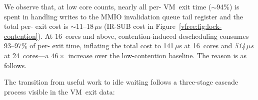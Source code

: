 We observe that, at low core counts, nearly all per- VM~exit time (${\sim}$94\%) is spent in handling writes to the MMIO invalidation queue tail register 
and the total per- exit cost is ${\sim}$11--18\,$\mu$s (IR-SUB cost in Figure~\ref{vfree:fig:lock-contention}).
At 16~cores and above, contention-induced descheduling consumes
 {93--97\%} of per- exit time, inflating the total cost to 141\,$\mu$s at 16~cores and \textit{514\,$\mu$s} at 24~cores---a $46\times$ increase over the low-contention baseline.
 The reason is as follows.



The transition from useful work to idle waiting follows a three-stage cascade process visible in the VM~exit data:

